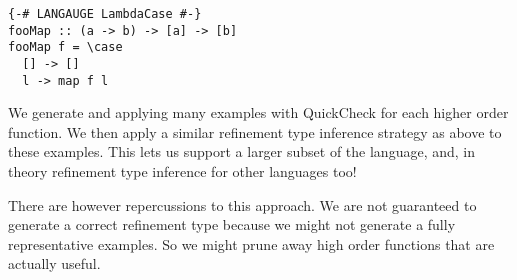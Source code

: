 \begin{lstlisting}
{-# LANGAUGE LambdaCase #-}
fooMap :: (a -> b) -> [a] -> [b]
fooMap f = \case
  [] -> []
  l -> map f l
 \end{lstlisting}

We generate and applying many examples with QuickCheck for each higher order function.
We then apply a similar refinement type inference strategy as above to these examples.
This lets us support a larger subset of the language, and, in theory refinement type inference for other languages too!

There are however repercussions to this approach. We are not guaranteed to generate a correct refinement type because we might not generate a fully representative examples. So we might prune away high order functions that are actually useful. 
